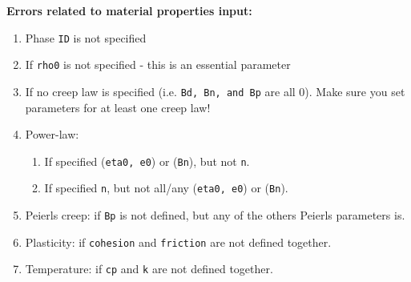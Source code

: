 \documentclass[a4paper,11pt]{article}
\begin{document}
\textbf{Errors related to material properties input:}
\begin{enumerate}
\item Phase \texttt{ID} is not specified
\item If \texttt{rho0} is not specified - this is an essential parameter
\item If no creep law is specified (i.e. \texttt{Bd, Bn, and Bp} are all 0). Make sure you set parameters for at least one creep law!
\item Power-law: 
	\begin{enumerate}
	\item If specified (\texttt{eta0, e0}) or (\texttt{Bn}), but not \texttt{n}.
	\item If specified \texttt{n}, but not all/any (\texttt{eta0, e0}) or (\texttt{Bn}).
	\end{enumerate}
\item Peierls creep: if \texttt{Bp} is not defined, but any of the others Peierls parameters is.
\item Plasticity: if \texttt{cohesion} and \texttt{friction} are not defined together.
\item Temperature: if \texttt{cp} and \texttt{k} are not defined together.

\end{enumerate}
\end{document}
